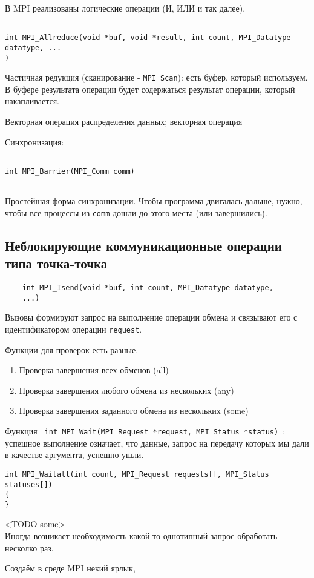 \documentclass[main.tex]{subfiles}
\begin{document}
В MPI реализованы логические операции (И, ИЛИ и так далее).

\begin{verbatim}

int MPI_Allreduce(void *buf, void *result, int count, MPI_Datatype datatype, ...
)

\end{verbatim}

Частичная редукция (сканирование - \texttt{MPI\_Scan}): есть буфер, который используем.
В буфере результата операции будет содержаться результат операции, который накапливается.

Векторная операция распределения данных;
векторная операция 

Синхронизация: 

\begin{verbatim}
	
int MPI_Barrier(MPI_Comm comm)
	
\end{verbatim}

Простейшая форма синхронизации.
Чтобы программа двигалась дальше, нужно, чтобы все процессы из \texttt{comm} дошли до этого места (или завершились).

\subsection{ Неблокирующие коммуникационные операции типа точка-точка }

\begin{verbatim}
	int MPI_Isend(void *buf, int count, MPI_Datatype datatype, 
	...)
\end{verbatim}

Вызовы формируют запрос на выполнение операции обмена и связывают его с идентификатором операции \texttt{request}.

Функции для проверок есть разные.

\begin{enumerate}
	\item Проверка завершения всех обменов (all)
	\item Проверка завершения любого обмена из нескольких (any)
	\item Проверка завершения заданного обмена из нескольких (some)
\end{enumerate}

Функция \texttt{ int MPI\_Wait(MPI\_Request *request, MPI\_Status *status) }:
успешное выполнение означает, что данные, запрос на передачу которых мы дали в качестве аргумента, успешно ушли.

\begin{verbatim}
int MPI_Waitall(int count, MPI_Request requests[], MPI_Status statuses[])
{
}
\end{verbatim}

<TODO some> \\

Иногда возникает  необходимость какой-то однотипный запрос обработать несколко раз.

Создаём в среде MPI некий ярлык, 
\end{document}
